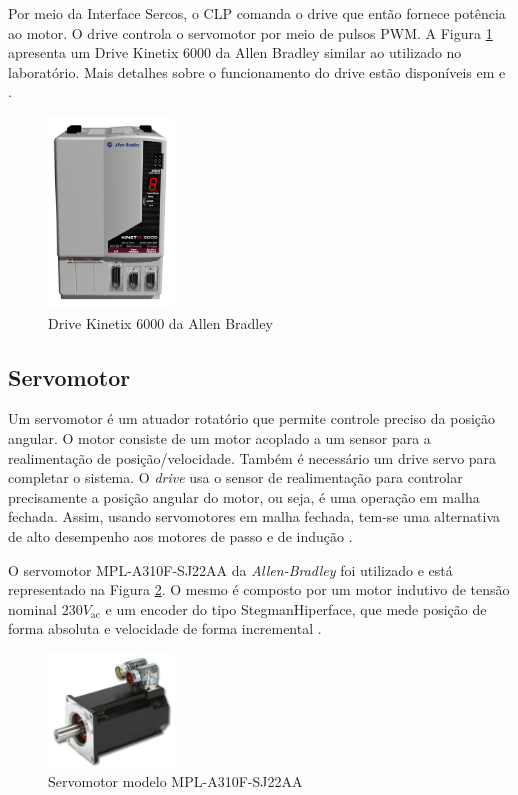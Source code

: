 Por meio da Interface Sercos, o CLP comanda o drive que então fornece potência ao motor. O drive controla o servomotor por meio de pulsos PWM. A Figura \ref{kinetix6000} apresenta um Drive Kinetix 6000 da Allen Bradley similar ao utilizado no laboratório. Mais detalhes sobre o funcionamento do drive estão disponíveis em \cite{redytton} e \cite{kinetix6000usermanual}.

\begin{figure}[!ht]
  \centering
    \includegraphics[width=0.3\textwidth]{figs/fundamentos/kinetix6000.jpg}
    \caption{Drive Kinetix 6000 da Allen Bradley\label{kinetix6000}}
\end{figure}

\subsection{Servomotor}

Um servomotor é um atuador rotatório que permite controle preciso da posição angular. O motor consiste de um motor acoplado a um sensor para a realimentação de posição/velocidade. Também é necessário um drive servo para completar o sistema. O \textit{drive} usa o sensor de realimentação para controlar precisamente a posição angular do motor, ou seja, é uma operação em malha fechada. Assim, usando servomotores em malha fechada, tem-se uma alternativa de alto desempenho aos motores de passo e de indução \cite{defServoMotores}.

O servomotor MPL-A310F-SJ22AA da \textit{Allen-Bradley} foi utilizado e está representado na Figura \ref{servomotor}. O mesmo é composto por um motor indutivo de tensão nominal $230V_{\mathrm{ac}}$ e um encoder do tipo StegmanHiperface, que mede posição de forma absoluta e velocidade de forma incremental \cite{redytton}.

\begin{figure}[!ht]
  \centering
    \includegraphics[width=0.3\textwidth]{figs/fundamentos/servomotor}
    \caption{Servomotor modelo MPL-A310F-SJ22AA\label{servomotor}}
\end{figure}

